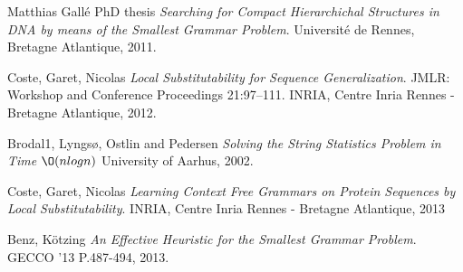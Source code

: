 \documentclass[11pt,a4paper,twoside]{tesis}
\begin{document}


\backmatter

\begin{thebibliography}{1}
   Matthias Gallé PhD thesis {\em Searching for Compact Hierarchichal Structures in DNA by means of the Smallest Grammar Problem}. Université de Rennes, Bretagne Atlantique,  2011.

   Coste, Garet, Nicolas {\em Local Substitutability for Sequence Generalization}. 
  JMLR: Workshop and Conference Proceedings 21:97–111.
  INRIA, Centre Inria Rennes - Bretagne Atlantique, 2012.

   Brodal1, Lyngsø, Ostlin and Pedersen {\em Solving the String Statistics Problem in Time $\O(nlogn)$} University of Aarhus, 2002.

   Coste, Garet, Nicolas {\em Learning Context Free Grammars on Protein Sequences by Local Substitutability}. INRIA, Centre Inria Rennes - Bretagne Atlantique, 2013

   Benz, Kötzing {\em An Effective Heuristic for the Smallest Grammar Problem}. 
  GECCO '13 P.487-494, 2013.


\end{thebibliography}
\end{document}
